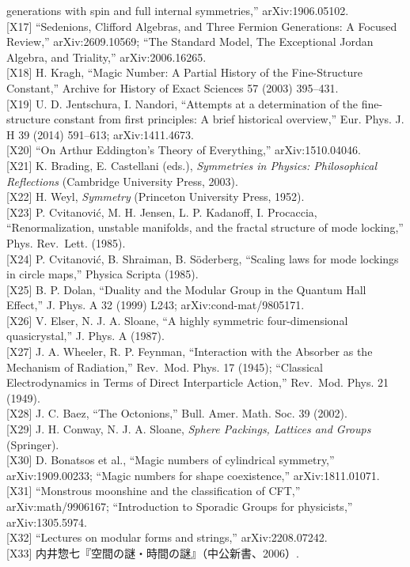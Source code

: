 \documentclass[
  a4paper,
]{ltjsarticle}
\begin{document}
generations with spin and full internal symmetries,''
arXiv:1906.05102.\\
{[}X17{]} ``Sedenions, Clifford Algebras, and Three Fermion Generations:
A Focused Review,'' arXiv:2609.10569; ``The Standard Model, The
Exceptional Jordan Algebra, and Triality,'' arXiv:2006.16265.\\
{[}X18{]} H. Kragh, ``Magic Number: A Partial History of the
Fine-Structure Constant,'' Archive for History of Exact Sciences 57
(2003) 395--431.\\
{[}X19{]} U. D. Jentschura, I. Nandori, ``Attempts at a determination of
the fine-structure constant from first principles: A brief historical
overview,'' Eur. Phys. J. H 39 (2014) 591--613; arXiv:1411.4673.\\
{[}X20{]} ``On Arthur Eddington's Theory of Everything,''
arXiv:1510.04046.\\
{[}X21{]} K. Brading, E. Castellani (eds.), \emph{Symmetries in Physics:
Philosophical Reflections} (Cambridge University Press, 2003).\\
{[}X22{]} H. Weyl, \emph{Symmetry} (Princeton University Press, 1952).\\
{[}X23{]} P. Cvitanović, M. H. Jensen, L. P. Kadanoff, I. Procaccia,
``Renormalization, unstable manifolds, and the fractal structure of mode
locking,'' Phys. Rev.~Lett. (1985).\\
{[}X24{]} P. Cvitanović, B. Shraiman, B. Söderberg, ``Scaling laws for
mode lockings in circle maps,'' Physica Scripta (1985).\\
{[}X25{]} B. P. Dolan, ``Duality and the Modular Group in the Quantum
Hall Effect,'' J. Phys. A 32 (1999) L243; arXiv:cond-mat/9805171.\\
{[}X26{]} V. Elser, N. J. A. Sloane, ``A highly symmetric
four-dimensional quasicrystal,'' J. Phys. A (1987).\\
{[}X27{]} J. A. Wheeler, R. P. Feynman, ``Interaction with the Absorber
as the Mechanism of Radiation,'' Rev.~Mod. Phys. 17 (1945); ``Classical
Electrodynamics in Terms of Direct Interparticle Action,'' Rev.~Mod.
Phys. 21 (1949).\\
{[}X28{]} J. C. Baez, ``The Octonions,'' Bull. Amer. Math. Soc. 39
(2002).\\
{[}X29{]} J. H. Conway, N. J. A. Sloane, \emph{Sphere Packings, Lattices
and Groups} (Springer).\\
{[}X30{]} D. Bonatsos et al., ``Magic numbers of cylindrical symmetry,''
arXiv:1909.00233; ``Magic numbers for shape coexistence,''
arXiv:1811.01071.\\
{[}X31{]} ``Monstrous moonshine and the classification of CFT,''
arXiv:math/9906167; ``Introduction to Sporadic Groups for physicists,''
arXiv:1305.5974.\\
{[}X32{]} ``Lectures on modular forms and strings,'' arXiv:2208.07242.\\
{[}X33{]} 内井惣七『空間の謎・時間の謎』（中公新書、2006）.
\end{document}
